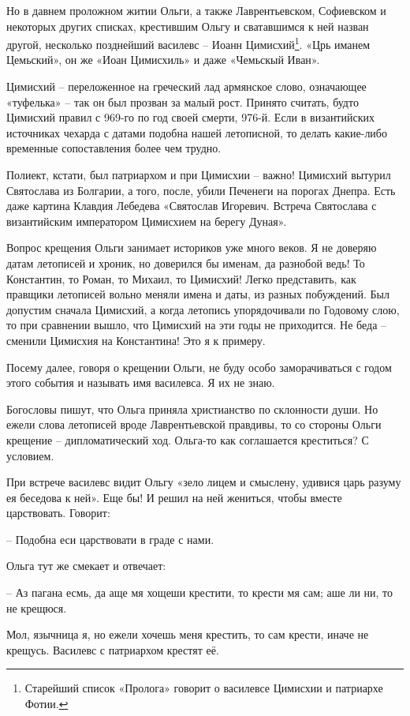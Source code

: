 Но в давнем проложном житии Ольги, а также Лаврентьевском, Софиевском и некоторых других списках, крестившим Ольгу и сватавшимся к ней назван другой, несколько позднейший василевс – Иоанн Цимисхий\footnote{Старейший список «Пролога» говорит о василевсе Цимисхии и патриархе Фотии.}. «Црь иманем Цемьский», он же «Иоан Цимисхиль» и даже «Чемьскый Иван». 

Цимисхий – переложенное на греческий лад армянское слово, означающее «туфелька» – так он был прозван за малый рост. Принято считать, будто Цимисхий правил с 969-го по год своей смерти, 976-й. Если в византийских источниках чехарда с датами подобна нашей летописной, то делать какие-либо временные сопоставления более чем трудно.

Полиект, кстати, был патриархом и при Цимисхии – важно! Цимисхий вытурил Святослава из Болгарии, а того, после, убили Печенеги на порогах Днепра. Есть даже картина Клавдия Лебедева «Святослав Игоревич. Встреча Святослава с византийским императором Цимисхием на берегу Дуная».

Вопрос крещения Ольги занимает историков уже много веков. Я не доверяю датам летописей и хроник, но доверился бы именам, да разнобой ведь! То Константин, то Роман, то Михаил, то Цимисхий! Легко представить, как правщики летописей вольно меняли имена и даты, из разных побуждений. Был допустим сначала Цимисхий, а когда летопись упорядочивали по Годовому слою, то при сравнении вышло, что Цимисхий на эти годы не приходится. Не беда – сменили Цимисхия на Константина! Это я к примеру.

Посему далее, говоря о крещении Ольги, не буду особо заморачиваться с годом этого события и называть имя василевса. Я их не знаю.

Богословы пишут, что Ольга приняла христианство по склонности души. Но ежели слова летописей вроде Лаврентьевской правдивы, то со стороны Ольги крещение – дипломатический ход. Ольга-то как соглашается креститься? С условием.

При встрече василевс видит Ольгу «зело лицем и смыслену, удивися царь разуму ея беседова к ней». Еще бы! И решил на ней жениться, чтобы вместе царствовать. Говорит: 

 – Подобна еси царствовати в граде с нами.

Ольга тут же смекает и отвечает:

 – Аз пагана есмь, да аще мя хощеши крестити, то крести мя сам; аше ли ни, то не крещюся.

Мол, язычница я, но ежели хочешь меня крестить, то сам крести, иначе не крещусь. Василевс с патриархом крестят её. 

